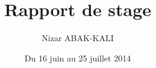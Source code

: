 \documentclass[a4paper,12pt,final]{article}
\title{Rapport de stage}
\author{Nizar ABAK-KALI}
\date{Du 16 juin au 25 juillet 2014}
\begin{document}


\cleardoublepage %



\cleardoublepage 

\tableofcontents
\sloppy

\cleardoublepage 



\cleardoublepage



\cleardoublepage



\cleardoublepage



\cleardoublepage



\cleardoublepage



\cleardoublepage



\cleardoublepage
\end{document}

